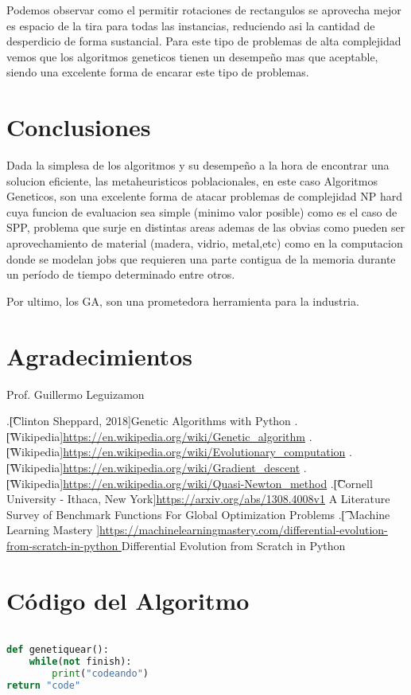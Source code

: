 \documentclass[10pt]{article}
\begin{document}
Podemos observar como el permitir rotaciones de rectangulos se aprovecha mejor es espacio de la tira para todas las instancias, reduciendo asi la cantidad de desperdicio de forma sustancial. Para este tipo de problemas de alta complejidad vemos que los algoritmos geneticos tienen un desempeño mas que aceptable, siendo una excelente forma de encarar este tipo de problemas.


\section{Conclusiones}
Dada la simplesa de los algoritmos y su desempeño a la hora de encontrar una solucion eficiente, las metaheuristicos poblacionales, en este caso Algoritmos Geneticos, son una excelente forma de atacar problemas de complejidad NP hard cuya funcion de evaluacion sea simple (minimo valor posible) como es el caso de SPP, problema que surje en distintas areas ademas de las obvias como pueden ser aprovechamiento de material (madera, vidrio, metal,etc) como en la computacion donde se modelan jobs que requieren una parte contigua de la memoria durante un período de tiempo determinado entre otros.

Por ultimo, los GA, son una prometedora herramienta para la industria.

\section*{Agradecimientos}
Prof. Guillermo Leguizamon


\begin{thebibliography}{99} %
.\t[Clinton Sheppard, 2018]{}Genetic Algorithms with Python
.\t[Wikipedia]{}\url{https://en.wikipedia.org/wiki/Genetic_algorithm}
.\t[Wikipedia]{}\url{https://en.wikipedia.org/wiki/Evolutionary_computation}
.\t[Wikipedia]{}\url{https://en.wikipedia.org/wiki/Gradient_descent}
.\t[Wikipedia]{}\url{https://en.wikipedia.org/wiki/Quasi-Newton_method}
.\t[Cornell University - Ithaca, New York]{}\url{https://arxiv.org/abs/1308.4008v1} A Literature Survey of Benchmark Functions For Global Optimization Problems
.\t[ Machine Learning Mastery ]{}\url{https://machinelearningmastery.com/differential-evolution-from-scratch-in-python } Differential Evolution from Scratch in Python


\end{thebibliography} 
 
\section{Código del Algoritmo}
\begin{lstlisting}[language=Python]

def genetiquear():
	while(not finish):
		print("codeando")
return "code"

\end{lstlisting}
\newpage
\tableofcontents
\end{document}
